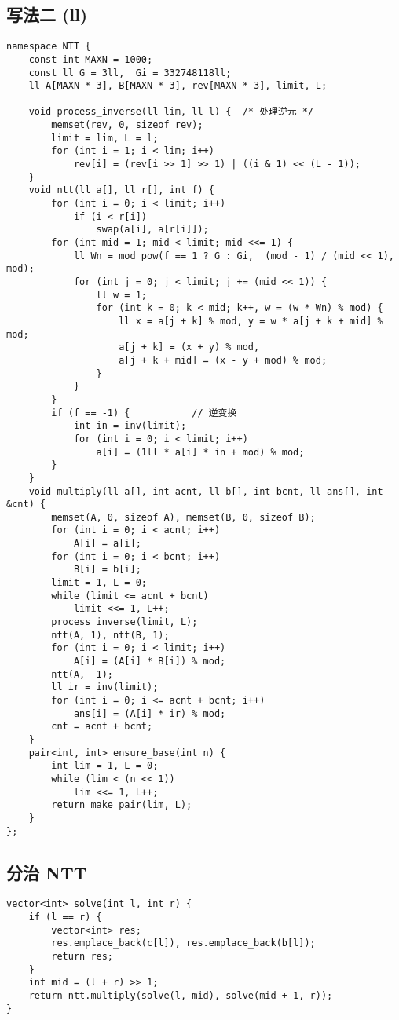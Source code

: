 \subsection{写法二 (ll)}
\begin{verbatim}
namespace NTT { 
    const int MAXN = 1000;  
    const ll G = 3ll,  Gi = 332748118ll;
    ll A[MAXN * 3], B[MAXN * 3], rev[MAXN * 3], limit, L;  
    
    void process_inverse(ll lim, ll l) {  /* 处理逆元 */
        memset(rev, 0, sizeof rev);  
        limit = lim, L = l;  
        for (int i = 1; i < lim; i++)
            rev[i] = (rev[i >> 1] >> 1) | ((i & 1) << (L - 1));  
    }  
    void ntt(ll a[], ll r[], int f) {  
        for (int i = 0; i < limit; i++)  
            if (i < r[i])  
                swap(a[i], a[r[i]]);                  
        for (int mid = 1; mid < limit; mid <<= 1) {  
            ll Wn = mod_pow(f == 1 ? G : Gi,  (mod - 1) / (mid << 1), mod);  
            for (int j = 0; j < limit; j += (mid << 1)) {  
                ll w = 1;  
                for (int k = 0; k < mid; k++, w = (w * Wn) % mod) {  
                    ll x = a[j + k] % mod, y = w * a[j + k + mid] % mod;  
                    a[j + k] = (x + y) % mod,  
                    a[j + k + mid] = (x - y + mod) % mod;  
                }  
            }  
        }  
        if (f == -1) {           // 逆变换   
            int in = inv(limit);  
            for (int i = 0; i < limit; i++)  
                a[i] = (1ll * a[i] * in + mod) % mod;  
        }  
    }
    void multiply(ll a[], int acnt, ll b[], int bcnt, ll ans[], int &cnt) {  
        memset(A, 0, sizeof A), memset(B, 0, sizeof B);  
        for (int i = 0; i < acnt; i++)  
            A[i] = a[i];  
        for (int i = 0; i < bcnt; i++)  
            B[i] = b[i];  
        limit = 1, L = 0;  
        while (limit <= acnt + bcnt)  
            limit <<= 1, L++;  
        process_inverse(limit, L);  
        ntt(A, 1), ntt(B, 1);  
        for (int i = 0; i < limit; i++)  
            A[i] = (A[i] * B[i]) % mod;  
        ntt(A, -1);  
        ll ir = inv(limit);  
        for (int i = 0; i <= acnt + bcnt; i++)  
            ans[i] = (A[i] * ir) % mod;  
        cnt = acnt + bcnt;  
    }  
    pair<int, int> ensure_base(int n) {  
        int lim = 1, L = 0;  
        while (lim < (n << 1))  
            lim <<= 1, L++;  
        return make_pair(lim, L);  
    }  
};  
\end{verbatim}

\subsection{分治 NTT}
\begin{verbatim}
vector<int> solve(int l, int r) {
    if (l == r) {
        vector<int> res;
        res.emplace_back(c[l]), res.emplace_back(b[l]);
        return res;
    }
    int mid = (l + r) >> 1;
    return ntt.multiply(solve(l, mid), solve(mid + 1, r));
}
\end{verbatim}